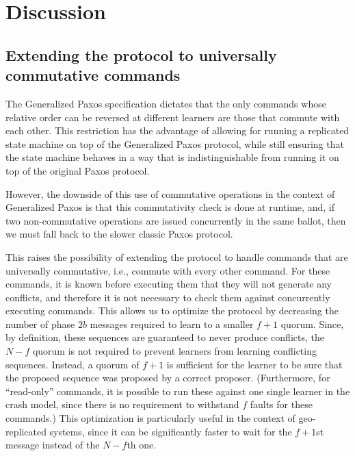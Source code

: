 \section{Discussion}
\label{sec:disc}

\subsection{Extending the protocol to universally commutative commands}

The Generalized Paxos specification dictates that the only commands
whose relative order can be reversed at different learners are those
that commute with each other. This restriction has the advantage of
allowing for running a replicated state machine on top of the
Generalized Paxos protocol, while still ensuring that the state
machine behaves in a way that is indistinguishable from running it on
top of the original Paxos protocol.

However, the downside of this use of commutative operations in the
context of Generalized Paxos is that this commutativity check is done
at runtime, and, if two non-commutative operations are issued
concurrently in the same ballot, then we must fall back to the slower
classic Paxos protocol.

This raises the possibility of extending the protocol to handle
commands that are universally commutative, i.e., commute with every
other command. For these commands, it is known before executing them
that they will not generate any conflicts, and therefore it is not
necessary to check them against concurrently executing commands.  This
allows us to optimize the protocol by decreasing the number of phase
$2b$ messages required to learn to a smaller $f+1$ quorum. Since, by
definition, these sequences are guaranteed to never produce conflicts,
the $N-f$ quorum is not required to prevent learners from learning
conflicting sequences. Instead, a quorum of $f+1$ is sufficient for
the learner to be sure that the proposed sequence was proposed by a
correct proposer. (Furthermore, for ``read-only'' commands, it is possible to run these
against one single learner in the crash model, since there is no
requirement to withstand $f$ faults for these commands.)
This optimization is particularly useful in the context of 
geo-replicated systems, since it can be significantly faster
to wait for the $f+1$st message instead of the $N-f$th one.

